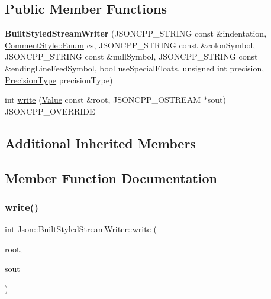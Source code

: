 \subsection*{Public Member Functions}
\begin{DoxyCompactItemize}
\item 
\mbox{\label{structJson_1_1BuiltStyledStreamWriter_a69c46ddeca7a524734ae2be0866a4d98}} 
{\bfseries Built\+Styled\+Stream\+Writer} (J\+S\+O\+N\+C\+P\+P\+\_\+\+S\+T\+R\+I\+NG const \&indentation, \hyperlink{structJson_1_1CommentStyle_a51fc08f3518fd81eba12f340d19a3d0c}{Comment\+Style\+::\+Enum} cs, J\+S\+O\+N\+C\+P\+P\+\_\+\+S\+T\+R\+I\+NG const \&colon\+Symbol, J\+S\+O\+N\+C\+P\+P\+\_\+\+S\+T\+R\+I\+NG const \&null\+Symbol, J\+S\+O\+N\+C\+P\+P\+\_\+\+S\+T\+R\+I\+NG const \&ending\+Line\+Feed\+Symbol, bool use\+Special\+Floats, unsigned int precision, \hyperlink{namespaceJson_af6e1447a3c43e3a62e11050dd0a11ce8}{Precision\+Type} precision\+Type)
\item 
int \hyperlink{structJson_1_1BuiltStyledStreamWriter_a823cdb1afabb6b0d5f39bcd5a6a6f747}{write} (\hyperlink{classJson_1_1Value}{Value} const \&root, J\+S\+O\+N\+C\+P\+P\+\_\+\+O\+S\+T\+R\+E\+AM $\ast$sout) J\+S\+O\+N\+C\+P\+P\+\_\+\+O\+V\+E\+R\+R\+I\+DE
\end{DoxyCompactItemize}
\subsection*{Additional Inherited Members}


\subsection{Member Function Documentation}
\mbox{\label{structJson_1_1BuiltStyledStreamWriter_a823cdb1afabb6b0d5f39bcd5a6a6f747}} 
\subsubsection{\texorpdfstring{write()}{write()}}
{\footnotesize\ttfamily int Json\+::\+Built\+Styled\+Stream\+Writer\+::write (\begin{DoxyParamCaption}\item[{\hyperlink{classJson_1_1Value}{Value} const \&}]{root,  }\item[{J\+S\+O\+N\+C\+P\+P\+\_\+\+O\+S\+T\+R\+E\+AM $\ast$}]{sout }\end{DoxyParamCaption})\hspace{0.3cm}{\ttfamily [virtual]}}

